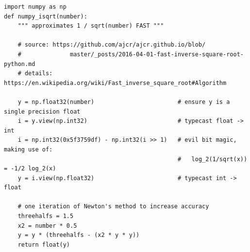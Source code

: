 
\begin{frame}[fragile]
%
\begin{codebox}
\begin{verbatim}
import numpy as np
def numpy_isqrt(number):
    """ approximates 1 / sqrt(number) FAST """
    
    # source: https://github.com/ajcr/ajcr.github.io/blob/
    #              master/_posts/2016-04-01-fast-inverse-square-root-python.md
    # details: https://en.wikipedia.org/wiki/Fast_inverse_square_root#Algorithm
    
    y = np.float32(number)                        # ensure y is a single precision float    
    i = y.view(np.int32)                          # typecast float -> int
    i = np.int32(0x5f3759df) - np.int32(i >> 1)   # evil bit magic, making use of:
                                                  #   log_2(1/sqrt(x)) = -1/2 log_2(x)
    y = i.view(np.float32)                        # typecast int -> float
    
    # one iteration of Newton's method to increase accuracy
    threehalfs = 1.5
    x2 = number * 0.5
    y = y * (threehalfs - (x2 * y * y))
    return float(y)
\end{verbatim}
\end{codebox}
%
\end{frame}


